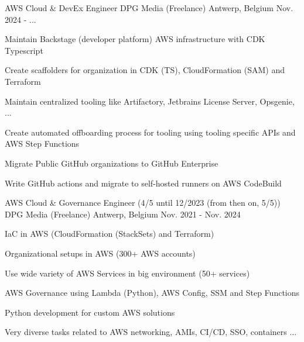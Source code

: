 

\begin{cventries}
  \cventry
    {AWS Cloud \& DevEx Engineer} %
    {DPG Media (Freelance)} %
    {Antwerp, Belgium} %
    {Nov. 2024 - ...} %
    {
      \begin{cvitems} %
        \item {Maintain Backstage (developer platform) AWS infrastructure with CDK Typescript}
        \item {Create scaffolders for  organization in CDK (TS), CloudFormation (SAM) and Terraform}
        \item {Maintain centralized tooling like Artifactory, Jetbrains License Server, Opsgenie, ...}
        \item {Create automated offboarding process for tooling using tooling specific APIs and AWS Step Functions}
        \item {Migrate Public GitHub organizations to GitHub Enterprise}       
        \item {Write GitHub actions and migrate to self-hosted runners on AWS CodeBuild}
      \end{cvitems}
    }

  \cventry
    {AWS Cloud \& Governance Engineer (4/5 until 12/2023 (from then on, 5/5))} %
    {DPG Media (Freelance)} %
    {Antwerp, Belgium} %
    {Nov. 2021 - Nov. 2024} %
    {
      \begin{cvitems} %
        \item {IaC in AWS (CloudFormation (StackSets) and Terraform)}
        \item {Organizational setups in AWS (300+ AWS accounts)}
        \item {Use wide variety of AWS Services in big environment (50+ services)}
        \item {AWS Governance using Lambda (Python), AWS Config, SSM and Step Functions}
        \item {Python development for custom AWS solutions}       
        \item {Very diverse tasks related to AWS networking, AMIs, CI/CD, SSO, containers ...}
      \end{cvitems}
    }


\end{cventries}
